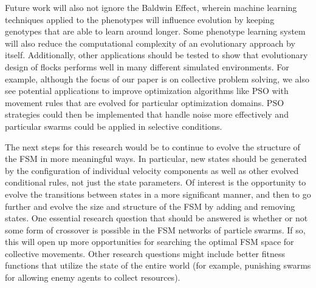 \documentclass[conference,final]{IEEEtran}
\begin{document}
Future work will also not ignore the Baldwin Effect, wherein machine learning techniques applied to the phenotypes will influence evolution by keeping genotypes that are able to learn around longer. Some phenotype learning system will also reduce the computational complexity of an evolutionary approach by itself. Additionally, other applications should be tested to show that evolutionary design of flocks performs well in many different simulated environments. For example, although the focus of our paper is on collective problem solving, we also see potential applications to improve optimization algorithms like PSO with movement rules that are evolved for particular optimization domains. PSO strategies could then be implemented that handle noise more effectively and particular swarms could be applied in selective conditions.

The next steps for this research would be to continue to evolve the structure of the FSM in more meaningful ways. In particular, new states should be generated by the configuration of individual velocity components as well as other evolved conditional rules, not just the state parameters. Of interest is the opportunity to evolve the transitions between states in a more significant manner, and then to go further and evolve the size and structure of the FSM by adding and removing states. One essential research question that should be answered is whether or not some form of crossover is possible in the FSM networks of particle swarms. If so, this will open up more opportunities for searching the optimal FSM space for collective movements. Other research questions might include better fitness functions that utilize the state of the entire world (for example, punishing swarms for allowing enemy agents to collect resources).




\end{document}
